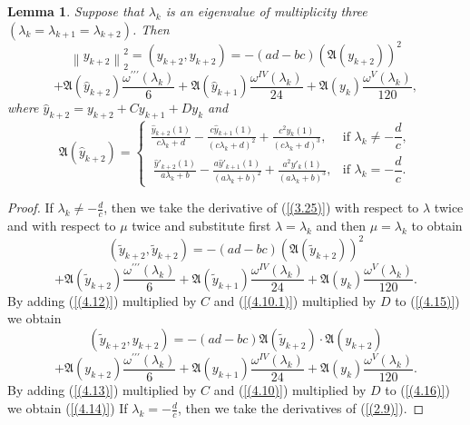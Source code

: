 \documentclass[pdflatex,sn-mathphys-num]{sn-jnl}%
\theoremstyle{thmstyleone}%
\theoremstyle{thmstyletwo}%
\theoremstyle{thmstylethree}%
\newtheorem{lem}[thm]{Lemma}
\theoremstyle{definition}
\theoremstyle{remark}
\numberwithin{equation}{section}
\begin{document}
\begin{lem} Suppose that  $\lambda _{k}$ is an eigenvalue of multiplicity three \((\lambda_{k}=\lambda_{k+1} =\lambda_{k+2})\). Then
$$
 {\left\| {y_{k+2}} \right\|}^{2}_{2}=(y_{k+2},y_{k+2})=- (ad - bc)(\mathfrak{A}(y_{k+2}))^2
 $$
 \begin{equation}
 +\mathfrak{A}(\hat{y}_{k+2})\frac{\omega^{\prime\prime\prime}(\lambda_k)}{6}+
 \mathfrak{A}(\hat{y}_{k+1})\frac{\omega^{IV}(\lambda_k)}{24}+ \mathfrak{A}({y}_{k})\frac{\omega^{V}(\lambda_k)}{120},\label{(4.14)}
\end{equation}
where $\hat{y}_{k+2}={y}_{k+2}+Cy_{k+1}+Dy_k$ and
\begin{equation}
\mathfrak{A}(\hat{y}_{k+2}) =
\begin{cases}
\displaystyle  
\frac{\hat{y}_{k + 2}(1)}{c\lambda_{k} + d} - \frac{c\hat{y}_{k+1}(1)}{\left( c\lambda_{k} + d \right)^{2}}
+\frac{c^2y_{k}(1)}{\left( c\lambda_{k} + d \right)^{3}}, 
&  \text{if }  \lambda_k \neq -\dfrac{d}{c}, \\[10pt]
\displaystyle \ 
\frac{\hat{y}'_{k + 2}(1)}{a\lambda_{k} + b} - \frac{a\hat{y}'_{k+1}(1)}{\left( a\lambda_{k} + b \right)^{2}}
+\frac{a^2y'_{k}(1)}{\left( a\lambda_{k} + b\right)^{3}}, 
& \text{if } \lambda_k = -\dfrac{d}{c}.
\end{cases}\label{(4.14.1)}
\end{equation}
\end{lem}

\begin{proof}
If $\lambda _{k}\ne -\frac{d}{c}$, then
we take the derivative of (\ref{(3.25)}) with respect to $\lambda$  twice and with respect to $\mu$ twice and substitute first $\lambda=\lambda_k$ and then $\mu=\lambda_k$ to obtain 
$$
 (\tilde{y}_{k+2},\tilde{y}_{k+2})=- (ad - bc)(\mathfrak{A}(\tilde{y}_{k+2}))^2
 $$
 \begin{equation}
 +\mathfrak{A}(\tilde{y}_{k+2})\frac{\omega^{\prime\prime\prime}(\lambda_k)}{6}+
 \mathfrak{A}(\tilde{y}_{k+1})\frac{\omega^{IV}(\lambda_k)}{24}+ \mathfrak{A}({y}_{k})\frac{\omega^{V}(\lambda_k)}{120}.\label{(4.15)}
\end{equation}
By adding (\ref{(4.12)}) multiplied by $C$ and (\ref{(4.10.1)}) multiplied by $D$ to (\ref{(4.15)}) we obtain 
$$
 (\tilde{y}_{k+2},{y}_{k+2})=- (ad - bc)\mathfrak{A}(\tilde{y}_{k+2})\cdot\mathfrak{A}({y}_{k+2})
 $$
\begin{equation}
+\mathfrak{A}({y}_{k+2})\frac{\omega^{\prime\prime\prime}(\lambda_k)}{6}+ \mathfrak{A}({y}_{k+1})\frac{\omega^{IV}(\lambda_k)}{24}+\mathfrak{A}({y}_{k})\frac{\omega^{V}(\lambda_k)}{120}.\label{(4.16)}
\end{equation}
By adding (\ref{(4.13)}) multiplied by $C$ and (\ref{(4.10)}) multiplied by $D$ to (\ref{(4.16)}) we obtain (\ref{(4.14)})
If $\lambda _{k}=-\frac{d}{c}$, then we take the derivatives of (\ref{(2.9)}).
\end{proof}
\end{document}
